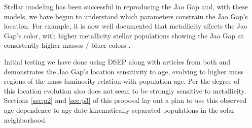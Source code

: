 Stellar modeling has been successful in reproducing the Jao Gap
\citep[e.g.][]{Feiden2021,Mansfield2021} and, with these models, we have begun
to understand which parameters constrain the Jao Gap's location. For example,
it is now well documented that metallicity affects the Jao Gap's color, with
higher metallicity stellar populations showing the Jao Gap at consistently
higher masses / bluer colors \citep{Mansfield2021}.

Initial testing we have done using DSEP along with articles from both
\citeauthor{Feiden2021} and \citeauthor{Mansfield2021} demonstrates the Jao Gap's
location sensitivity to age, evolving to higher mass regions of the
mass-luminosity relation with population age. Per \citet{Mansfield2021} the
degree of this location evolution also does not seem to be strongly sensitive
to metallicity. Sections \ref{sec:p2} and \ref{sec:p3} of this proposal lay out
a plan to use this observed age dependence to age-date kinematically separated
populations in the solar neighborhood.
